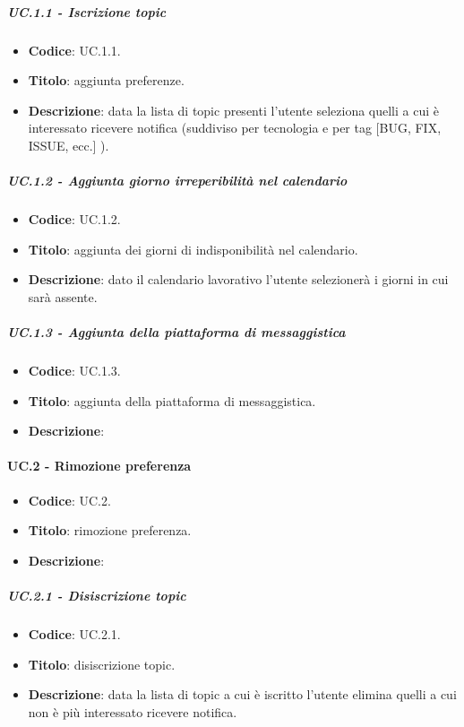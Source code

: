 	\subparagraph{UC\theuccount.1.1 - Iscrizione topic}
	\begin{itemize}
		\item \textbf{Codice}: UC\theuccount.1.1.
		\item \textbf{Titolo}: aggiunta preferenze.
		\item \textbf{Descrizione}: data la lista di topic presenti l'utente seleziona quelli a cui è interessato ricevere notifica (suddiviso per tecnologia e per tag [BUG, FIX, ISSUE, ecc.] ).
	\end{itemize}
		
			
	\subparagraph{UC\theuccount.1.2 - Aggiunta giorno irreperibilità nel calendario} 
	\begin{itemize}
		\item \textbf{Codice}: UC\theuccount.1.2.
		\item \textbf{Titolo}: aggiunta dei giorni di indisponibilità nel calendario.
		\item \textbf{Descrizione}: dato il calendario lavorativo l'utente selezionerà i giorni in cui sarà assente.
	\end{itemize}
			
	\subparagraph{UC\theuccount.1.3 - Aggiunta della piattaforma di messaggistica}
	\begin{itemize}
		\item \textbf{Codice}: UC\theuccount.1.3.
		\item \textbf{Titolo}: aggiunta della piattaforma di messaggistica.
		\item \textbf{Descrizione}: 
	\end{itemize}
			



	\paragraph{UC\theuccount.2 - Rimozione preferenza}
	\begin{itemize}
		\item \textbf{Codice}: UC\theuccount.2.
		\item \textbf{Titolo}: rimozione preferenza.
		\item \textbf{Descrizione}: 
	\end{itemize}
	
	
	\subparagraph{UC\theuccount.2.1 - Disiscrizione topic}
	\begin{itemize}
		\item \textbf{Codice}: UC\theuccount.2.1.
		\item \textbf{Titolo}: disiscrizione topic.
		\item \textbf{Descrizione}: data la lista di topic a cui è iscritto l'utente elimina quelli a cui non è più interessato ricevere notifica.
	\end{itemize}
	
